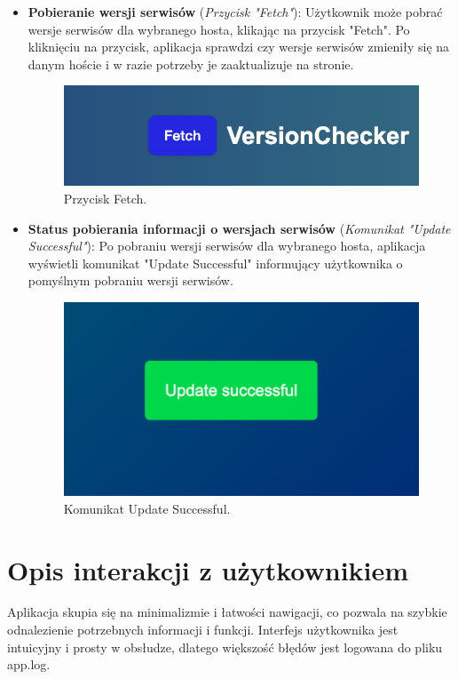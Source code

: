 \begin{itemize}
    \item \textbf{Pobieranie wersji serwisów} (\textit{Przycisk "Fetch"}):
    Użytkownik może pobrać wersje serwisów dla wybranego hosta, klikając na przycisk "Fetch". Po kliknięciu na przycisk, aplikacja sprawdzi czy wersje serwisów zmieniły się na danym hoście i w razie potrzeby je zaaktualizuje na stronie. 
        \begin{figure}[H]
        \centering
        \includegraphics[width=\textwidth]{photos/fetchButton.png}
        \caption{Przycisk Fetch.}
        \end{figure}
    \clearpage
    \item \textbf{Status pobierania informacji o wersjach serwisów} (\textit{Komunikat "Update Successful"}):
    Po pobraniu wersji serwisów dla wybranego hosta, aplikacja wyświetli komunikat "Update Successful" informujący użytkownika o pomyślnym pobraniu wersji serwisów.
        \begin{figure}[H]
        \centering
        \includegraphics[width=\textwidth]{photos/SUCCESS.png}
        \caption{Komunikat Update Successful.}
        \end{figure}

\end{itemize}
\section{Opis interakcji z użytkownikiem}
Aplikacja skupia się na minimalizmie i łatwości nawigacji, co pozwala na szybkie odnalezienie potrzebnych informacji i funkcji. Interfejs użytkownika jest intuicyjny i prosty w obsłudze, dlatego większość błędów jest logowana do pliku app.log. 
